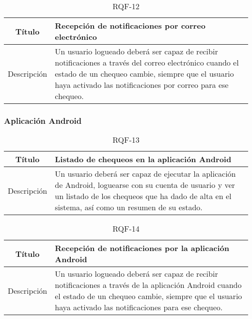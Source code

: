 \begin{table}[h!]
  \centering
  \begin{tabularx}{\textwidth}{|c|X|}
    \hline
    Título & Recepción de notificaciones por correo electrónico \\

    \hline

    Descripción & Un usuario logueado deberá ser capaz de recibir notificaciones
    a través del correo electrónico cuando el estado de un chequeo cambie,
    siempre que el usuario haya activado las notificaciones por correo para ese
    chequeo. \\

    \hline
  \end{tabularx}
  \caption{RQF-12}
\end{table}

\FloatBarrier
\subsubsection{Aplicación Android}


\begin{table}[h!]
  \centering
  \begin{tabularx}{\textwidth}{|c|X|}
    \hline
    Título & Listado de chequeos en la aplicación Android \\

    \hline

    Descripción & Un usuario deberá ser capaz de ejecutar la aplicación de
    Android, loguearse con su cuenta de usuario y ver un listado de los chequeos
    que ha dado de alta en el sistema, así como un resumen de su estado.
    \\

    \hline
  \end{tabularx}
  \caption{RQF-13}
\end{table}


\begin{table}[h!]
  \centering
  \begin{tabularx}{\textwidth}{|c|X|}
    \hline
    Título & Recepción de notificaciones por la aplicación Android \\

    \hline

    Descripción & Un usuario logueado deberá ser capaz de recibir notificaciones
    a través de la aplicación Android cuando el estado de un chequeo cambie,
    siempre que el usuario haya activado las notificaciones para ese
    chequeo. \\

    \hline
  \end{tabularx}
  \caption{RQF-14}
\end{table}

